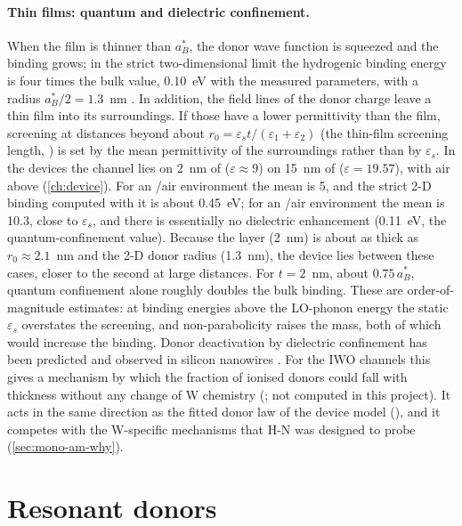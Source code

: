 \paragraph{Thin films: quantum and dielectric confinement.} When the film is thinner than $a_B^*$, the donor wave
function is squeezed and the binding grows; in the strict two-dimensional limit the hydrogenic binding energy is four
times the bulk value, 0.10~eV with the measured parameters, with a radius $a_B^*/2 = 1.3$~nm \citep{Bastard1981b}.
In addition, the field lines of the donor charge leave a thin film into its surroundings. If those have a lower
permittivity than the film, screening at distances beyond about $r_0 = \varepsilon_s t/(\varepsilon_1+\varepsilon_2)$ (the thin-film screening
length, \citealp{Cudazzo2011})
is set by the mean permittivity of the surroundings rather than by $\varepsilon_s$. In the devices the channel lies
on 2~nm of \AlO{} ($\varepsilon\approx9$) on 15~nm of \HfO{} ($\varepsilon = 19.57$), with air above
(\cref{ch:device}). For an \AlO{}/air environment the mean is 5, and the strict 2-D binding computed with it is about
0.45~eV; for an \HfO{}/air environment the mean is 10.3, close to $\varepsilon_s$, and there is essentially no
dielectric enhancement (0.11~eV, the quantum-confinement value). Because the \AlO{} layer (2~nm) is about as thick as
$r_0 \approx 2.1$~nm and the 2-D donor radius (1.3~nm), the device lies between these cases, closer to the second at
large distances. For $t = 2$~nm, about $0.75\,a_B^*$, quantum confinement alone roughly doubles the bulk binding. These
are order-of-magnitude estimates: at binding energies above the LO-phonon energy the static $\varepsilon_s$ overstates
the screening, and non-parabolicity raises the mass, both of which would increase the binding. Donor deactivation by dielectric confinement has been predicted and observed in
silicon nanowires \citep{Diarra2007,Bjork2009}. For the IWO channels this gives a mechanism by which the fraction of
ionised donors could fall with thickness without any change of W chemistry (; not computed in this
project). It acts in the same direction as the fitted donor law of the device model (), and it competes
with the W-specific mechanisms that H-N was designed to probe (\cref{sec:mono-am-why}).

\section{Resonant donors}
\label{sec:mono-defect-resonant}

